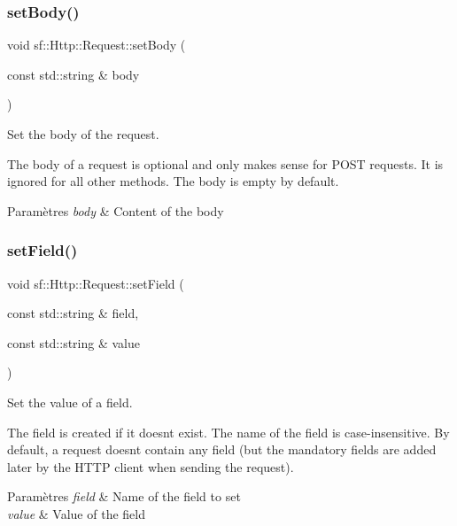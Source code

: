 \subsubsection{\texorpdfstring{set\+Body()}{setBody()}}
{\footnotesize\ttfamily void sf\+::\+Http\+::\+Request\+::set\+Body (\begin{DoxyParamCaption}\item[{const std\+::string \&}]{body }\end{DoxyParamCaption})}



Set the body of the request. 

The body of a request is optional and only makes sense for P\+O\+ST requests. It is ignored for all other methods. The body is empty by default.


\begin{DoxyParams}{Paramètres}
{\em body} & Content of the body \\
\hline
\end{DoxyParams}
\mbox{\label{classsf_1_1Http_1_1Request_aea672fae5dd089f4b6b3745ed46210d2}} 
\subsubsection{\texorpdfstring{set\+Field()}{setField()}}
{\footnotesize\ttfamily void sf\+::\+Http\+::\+Request\+::set\+Field (\begin{DoxyParamCaption}\item[{const std\+::string \&}]{field,  }\item[{const std\+::string \&}]{value }\end{DoxyParamCaption})}



Set the value of a field. 

The field is created if it doesn\textquotesingle{}t exist. The name of the field is case-\/insensitive. By default, a request doesn\textquotesingle{}t contain any field (but the mandatory fields are added later by the H\+T\+TP client when sending the request).


\begin{DoxyParams}{Paramètres}
{\em field} & Name of the field to set \\
\hline
{\em value} & Value of the field \\
\hline
\end{DoxyParams}
\mbox{\label{classsf_1_1Http_1_1Request_aa683b607b737a6224a91387b4108d3c7}} 
